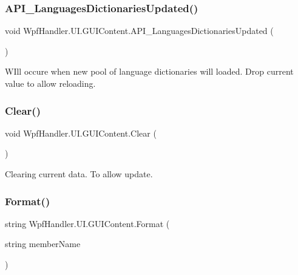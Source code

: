 \subsubsection{\texorpdfstring{A\+P\+I\+\_\+\+Languages\+Dictionaries\+Updated()}{API\_LanguagesDictionariesUpdated()}}
{\footnotesize\ttfamily void Wpf\+Handler.\+U\+I.\+G\+U\+I\+Content.\+A\+P\+I\+\_\+\+Languages\+Dictionaries\+Updated (\begin{DoxyParamCaption}{ }\end{DoxyParamCaption})\hspace{0.3cm}{\ttfamily [private]}}



W\+Ill occure when new pool of language dictionaries will loaded. Drop current value to allow reloading. 

\mbox{\label{class_wpf_handler_1_1_u_i_1_1_g_u_i_content_ae691340b5a25a5497d9f64d4b0adddd6}} 
\subsubsection{\texorpdfstring{Clear()}{Clear()}}
{\footnotesize\ttfamily void Wpf\+Handler.\+U\+I.\+G\+U\+I\+Content.\+Clear (\begin{DoxyParamCaption}{ }\end{DoxyParamCaption})}



Clearing current data. To allow update. 

\mbox{\label{class_wpf_handler_1_1_u_i_1_1_g_u_i_content_ad37327acd55ad09e036f284970d1e022}} 
\subsubsection{\texorpdfstring{Format()}{Format()}}
{\footnotesize\ttfamily string Wpf\+Handler.\+U\+I.\+G\+U\+I\+Content.\+Format (\begin{DoxyParamCaption}\item[{string}]{member\+Name }\end{DoxyParamCaption})}



